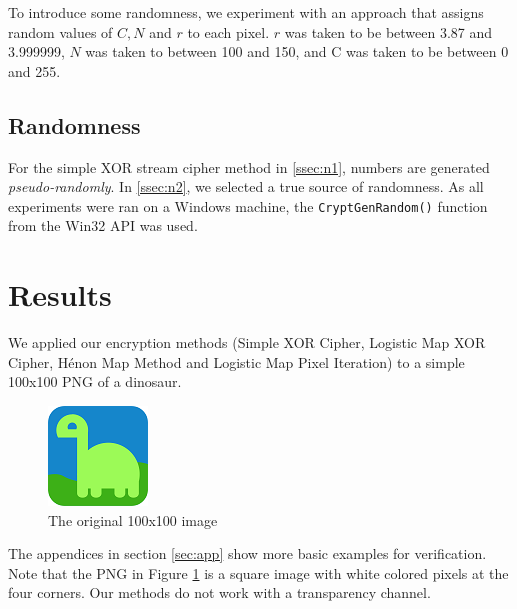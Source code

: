 \documentclass[10pt]{article}
\begin{document}
    To introduce some randomness, we experiment with an approach that assigns random values of $C, N$ and $r$ to each pixel. $r$ was taken to be between 3.87 and 3.999999, $N$ was taken to between 100 and 150, and C was taken to be between 0 and 255.
    
    \subsection{Randomness}
    
    For the simple XOR stream cipher method in \ref{ssec:n1}, numbers are generated \textit{pseudo-randomly}. In \ref{ssec:n2}, we selected a true source of randomness. As all experiments were ran on a Windows machine, the \verb|CryptGenRandom()| function from the Win32 API was used.
    
    \section{Results} \label{sec:res}
    
    We applied our encryption methods (Simple XOR Cipher, Logistic Map XOR Cipher, Hénon Map Method and Logistic Map Pixel Iteration) to a simple 100x100 PNG of a dinosaur.
    
    \begin{figure}[htbp]
        \centering
        \includegraphics[width=0.5\columnwidth]{lightDino.png}
        \caption{The original 100x100 image}
        \label{fig1}
    \end{figure}

    The appendices in section \ref{sec:app} show more basic examples for verification. Note that the PNG in Figure \ref{fig1} is a square image with white colored pixels at the four corners. Our methods do not work with a transparency channel.
    
\end{document}
